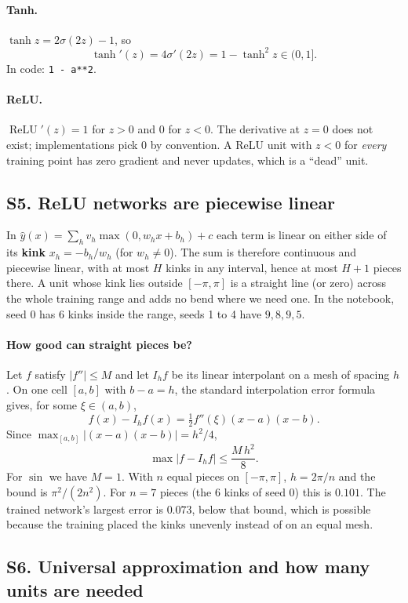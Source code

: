 \documentclass[11pt]{article}
\DeclareMathOperator{\relu}{ReLU}
\begin{document}
\paragraph{Tanh.} $\tanh z=2\sigma(2z)-1$, so
\[
  \tanh'(z)=4\sigma'(2z)=1-\tanh^2z\in(0,1].
\]
In code: \texttt{1 - a**2}.

\paragraph{ReLU.} $\relu'(z)=1$ for $z>0$ and $0$ for $z<0$. The derivative at $z=0$ does not exist; implementations pick $0$ by convention. A ReLU unit with $z<0$ for \emph{every} training point has zero gradient and never updates, which is a ``dead'' unit.

\label{sec:S5}
\subsection*{S5. ReLU networks are piecewise linear}
In $\hat y(x)=\sum_hv_h\max(0,w_hx+b_h)+c$ each term is linear on either side of its \textbf{kink} $x_h=-b_h/w_h$ (for $w_h\ne0$). The sum is therefore continuous and piecewise linear, with at most $H$ kinks in any interval, hence at most $H+1$ pieces there. A unit whose kink lies outside $[-\pi,\pi]$ is a straight line (or zero) across the whole training range and adds no bend where we need one. In the notebook, seed 0 has $6$ kinks inside the range, seeds 1 to 4 have $9,8,9,5$.

\paragraph{How good can straight pieces be?} Let $f$ satisfy $|f''|\le M$ and let $I_hf$ be its linear interpolant on a mesh of spacing $h$. On one cell $[a,b]$ with $b-a=h$, the standard interpolation error formula gives, for some $\xi\in(a,b)$,
\[
  f(x)-I_hf(x)=\tfrac12f''(\xi)(x-a)(x-b).
\]
Since $\max_{[a,b]}|(x-a)(x-b)|=h^2/4$,
\[
  \max|f-I_hf|\le\frac{M\,h^2}{8}.
\]
For $\sin$ we have $M=1$. With $n$ equal pieces on $[-\pi,\pi]$, $h=2\pi/n$ and the bound is $\pi^2/(2n^2)$. For $n=7$ pieces (the $6$ kinks of seed 0) this is $0.101$. The trained network's largest error is $0.073$, below that bound, which is possible because the training placed the kinks unevenly instead of on an equal mesh.

\subsection*{S6. Universal approximation and how many units are needed}
\end{document}
